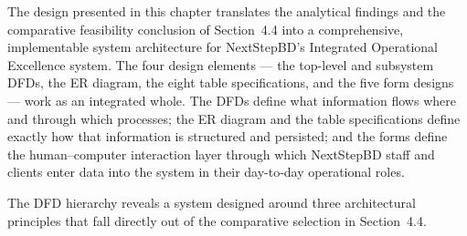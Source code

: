 \documentclass[12pt,a4paper]{report}
\begin{document}
The design presented in this chapter translates the analytical findings and
the comparative feasibility conclusion of Section~4.4 into a comprehensive,
implementable system architecture for NextStepBD's Integrated Operational
Excellence system. The four design elements --- the top-level and subsystem
DFDs, the ER diagram, the eight table specifications, and the five form
designs --- work as an integrated whole. The DFDs define what information
flows where and through which processes; the ER diagram and the table
specifications define exactly how that information is structured and
persisted; and the forms define the human--computer interaction layer through
which NextStepBD staff and clients enter data into the system in their
day-to-day operational roles.

The DFD hierarchy reveals a system designed around three architectural
principles that fall directly out of the comparative selection in
Section~4.4.
\end{document}
